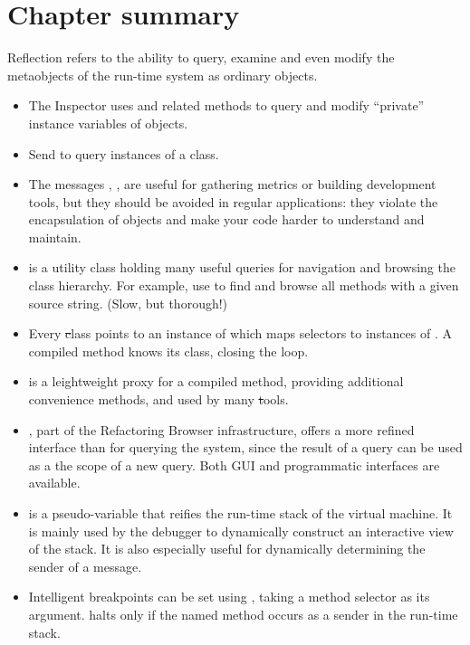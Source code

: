 \documentclass[a4paper,10pt,twoside]{book}
\begin{document}
\section{Chapter summary}

Reflection refers to the ability to query, examine and even modify the metaobjects of the run-time system as ordinary objects.

\begin{itemize}
\item The Inspector uses  and related methods to query and modify ``private'' instance variables of objects.
\item Send  to query instances of a class.
\item The messages , ,  \etc  are useful for gathering metrics or building development tools, but they should be avoided in regular applications: they violate the encapsulation of objects and make your code harder to understand and maintain.
\item {} is a utility class holding many useful queries for navigation and browsing the \ct class hierarchy. For example, use  to find and browse all methods with a given source string. (Slow, but thorough!)
\item Every \st class points to an instance of  which maps selectors to instances of . A compiled method knows its class, closing the loop.
\item {} is a leightweight proxy for a compiled method, providing additional convenience methods, and used by many \st tools.
\item {}, part of the Refactoring Browser infrastructure, offers a more refined interface than  for querying the system, since the result of a query can be used as a the scope of a new query. Both GUI and programmatic interfaces are available.
\item {} is a pseudo-variable that reifies the run-time stack of the virtual machine. It is mainly used by the debugger to dynamically construct an interactive view of the stack. It is also especially useful for dynamically determining the sender of a message.
\item Intelligent breakpoints can be set using , taking a method selector as its argument.  halts only if the named method occurs as a sender in the run-time stack.

\end{itemize}
\end{document}
